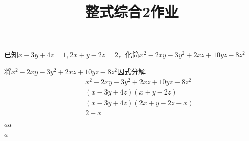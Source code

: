 \documentclass[windows,csize4]{BHCexam}
\title{整式综合2作业}
\begin{document}
\maketitle


\begin{groups}
    \begin{questions}[]

        \question[5] 已知$x-3y+4z=1,2x+y-2z=2$，化简$x^2-2xy-3y^2+2xz+10yz-8z^2$
        \begin{solution}{0.5cm}
            \methodonly 将$x^2-2xy-3y^2+2xz+10yz-8z^2$因式分解
            \[
                \begin{aligned}
                    &\phantom{=} x^2-2xy-3y^2+2xz+10yz-8z^2 \\ 
                    &=(x-3y+4z)(x+y-2z) \\ 
                    &=(x-3y+4z)(2x+y-2z-x) \\ 
                    &=2-x
                \end{aligned}
            \]
        \end{solution}
        \vspace{3.5cm}








        \question[5] $aa$
        \begin{solution}{0.5cm}
            \methodonly $a$
        \end{solution}
        \vspace{3.5cm}

    \end{questions}

\end{groups}


\label{lastpage}
\end{document}
